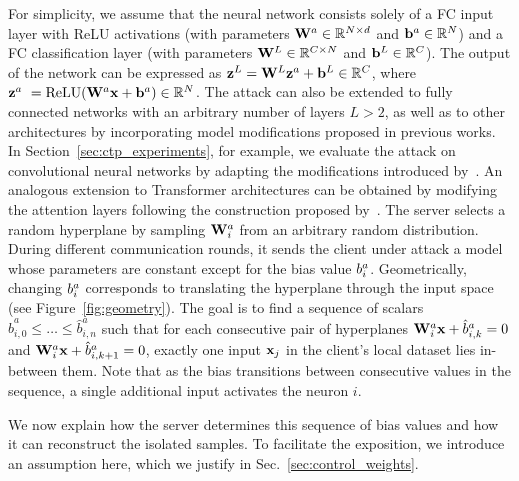 For simplicity, we assume that the neural network consists solely of a FC input layer with ReLU activations (with parameters $\mathbf{W}^{a} \in \mathbb{R}^{N \times d}$ and ${\mathbf{b}}^{a} \in \mathbb{R}^{N}$) and a FC classification layer (with parameters $\mathbf{W}^{L} \in \mathbb{R}^{C\times N}$ and ${\mathbf{b}}^{L} \in \mathbb{R}^{C}$). The output of the network can be expressed as ${\mathbf{z}}^{L}=\mathbf{W}^{L}{\mathbf{z}}^{a}+{\mathbf{b}}^{L} \in \mathbb{R}^C$, where ${\mathbf{z}}^{a}~=\textrm{ReLU}(\mathbf{W}^{a}{\mathbf{x}}+{\mathbf{b}}^{a}) \in \mathbb{R}^N$.
The attack can also be extended to fully connected networks with an arbitrary number of layers $L>2$, as well as to other architectures by incorporating model modifications proposed in previous works. In Section~\ref{sec:ctp_experiments}, for example, we evaluate the attack on convolutional neural networks by adapting the modifications introduced by~. An analogous extension to Transformer architectures can be obtained by modifying the attention layers following the construction proposed by~. 
The server selects a random hyperplane by sampling $\mathbf{W}^{a}_i$ from an arbitrary random distribution. During different communication rounds, it sends the client under attack a model whose parameters are constant except for the bias value $b_i^{a}$.
Geometrically, changing $b_i^{a}$ corresponds to translating the hyperplane through the input space (see Figure~\ref{fig:geometry}). The goal is to find a sequence of scalars $\hat b^{a}_{i,0} \leq \dots \leq \hat b^{a}_{i,n}$ such that for each consecutive pair of hyperplanes $\mathbf{W}^{a}_i {\mathbf{x}} + \hat b^{a}_{i,k} = 0$ and $\mathbf{W}^{a}_i {\mathbf{x}} + \hat b^{a}_{i,k+1} = 0$, exactly one input ${\mathbf{x}}_j$ in the client's local dataset lies in-between them.
Note that as the bias transitions between consecutive values in the sequence, a single additional input activates the neuron $i$.

We now explain how the server determines this sequence of bias values and how it can reconstruct the isolated samples. To facilitate the exposition, we introduce an assumption here, which we justify in Sec.~\ref{sec:control_weights}.

